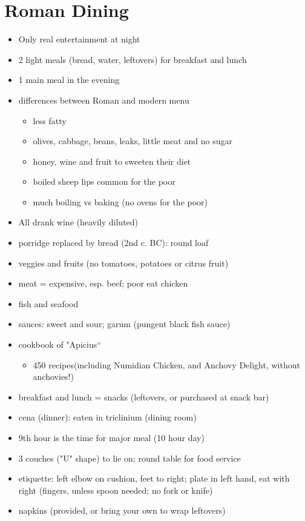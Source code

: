 \documentclass[12pt, twoside]{article}
\begin{document}
\section{Roman Dining}
\begin{itemize}
\item Only real entertainment at night
\item 2 light meals (bread, water, leftovers) for breakfast and lunch
\item 1 main meal in the evening
\item differences between Roman and modern menu
	\begin{itemize}
	\item less fatty
	\item olives, cabbage, beans, leaks, little meat and no sugar
	\item honey, wine and fruit to sweeten their diet
	\item boiled sheep lips common for the poor
	\item much boiling vs baking (no ovens for the poor)
	\end{itemize}
\item All drank wine (heavily diluted)
\item porridge replaced by bread (2nd c. BC): round loaf
\item veggies and fruits (no tomatoes, potatoes or citrus fruit)
\item meat = expensive, esp. beef; poor eat chicken
\item fish and seafood
\item sauces: sweet and sour; garum (pungent black fish sauce)
\item cookbook of "Apicius“
	\begin{itemize}
	\item 450 recipes(including Numidian Chicken, and Anchovy Delight, without anchovies!)
	\end{itemize}
\item breakfast and lunch = snacks (leftovers, or purchased at snack bar)
\item cena (dinner): eaten in triclinium (dining room)
\item 9th hour is the time for major meal (10 hour day)
\item 3 couches ("U" shape) to lie on; round table for food service
\item etiquette: left elbow on cushion, feet to right; plate in left hand, eat with right (fingers, unless spoon needed; no fork or knife)
\item napkins (provided, or bring your own to wrap leftovers)

\end{itemize}
\end{document}
